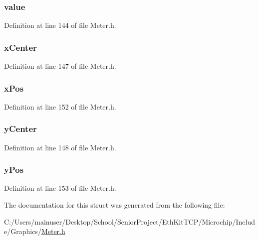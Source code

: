 \subsubsection[{value}]{ value}\label{struct_m_e_t_e_r_ac4d3490391236691d132e3085e887474}


Definition at line 144 of file Meter.\+h.

\hypertarget{struct_m_e_t_e_r_aea1d1e18200cb2a91fcd74c6e1172ba8}{}
\subsubsection[{x\+Center}]{ x\+Center}\label{struct_m_e_t_e_r_aea1d1e18200cb2a91fcd74c6e1172ba8}


Definition at line 147 of file Meter.\+h.

\hypertarget{struct_m_e_t_e_r_a54c47eaab0c4f75c83127414666fd5dd}{}
\subsubsection[{x\+Pos}]{ x\+Pos}\label{struct_m_e_t_e_r_a54c47eaab0c4f75c83127414666fd5dd}


Definition at line 152 of file Meter.\+h.

\hypertarget{struct_m_e_t_e_r_aeb7c9f7af073c797530bda5b0989e239}{}
\subsubsection[{y\+Center}]{ y\+Center}\label{struct_m_e_t_e_r_aeb7c9f7af073c797530bda5b0989e239}


Definition at line 148 of file Meter.\+h.

\hypertarget{struct_m_e_t_e_r_a983a75cb3392c5927d1c9cc9a2c2f22e}{}
\subsubsection[{y\+Pos}]{ y\+Pos}\label{struct_m_e_t_e_r_a983a75cb3392c5927d1c9cc9a2c2f22e}


Definition at line 153 of file Meter.\+h.



The documentation for this struct was generated from the following file\+:\begin{DoxyCompactItemize}
\item 
C\+:/\+Users/mainuser/\+Desktop/\+School/\+Senior\+Project/\+Eth\+Kit\+T\+C\+P/\+Microchip/\+Include/\+Graphics/\hyperlink{_meter_8h}{Meter.\+h}\end{DoxyCompactItemize}
